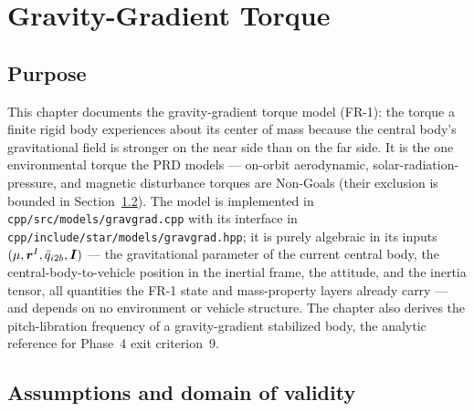 \chapter{Gravity-Gradient Torque}
\label{ch:gravgrad}

\section{Purpose}
\label{sec:gravgrad:purpose}

This chapter documents the gravity-gradient torque model (FR-1): the torque
a finite rigid body experiences about its center of mass because the
central body's gravitational field is stronger on the near side than on the
far side. It is the one environmental torque the PRD models --- on-orbit
aerodynamic, solar-radiation-pressure, and magnetic disturbance torques are
Non-Goals (their exclusion is bounded in
Section~\ref{sec:gravgrad:domain}). The model is implemented in
\texttt{cpp/src/models/gravgrad.cpp} with its interface in
\texttt{cpp/include/star/models/gravgrad.hpp}; it is purely algebraic in
its inputs $(\mu, \bm{r}^{I}, \bar{q}_{i2b}, \bm{I})$ --- the
gravitational parameter of the current central body, the
central-body-to-vehicle position in the inertial frame, the attitude, and
the inertia tensor, all quantities the FR-1 state and mass-property layers
already carry --- and depends on no environment or vehicle structure. The
chapter also derives the pitch-libration frequency of a gravity-gradient
stabilized body, the analytic reference for Phase~4 exit criterion~9.

\section{Assumptions and domain of validity}
\label{sec:gravgrad:domain}

